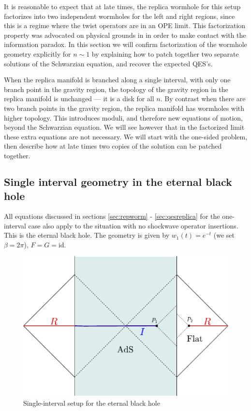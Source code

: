 \documentclass[12pt]{article}
\numberwithin{equation}{section}
\begin{document}
\begin{spacing}{1.1}
It is reasonable to expect that at late times, the replica wormhole for this setup factorizes into two independent wormholes for the left and right regions, since this is a regime where the twist operators are in an OPE limit. This factorization property was advocated on physical grounds in \cite[Section 5]{Almheiri:2019qdq} in order to make contact with the information paradox. In this section we will confirm factorization of the wormhole geometry explicitly for $n \sim 1$ by explaining how to patch together two separate solutions of the Schwarzian equation, and recover the expected QES's.
 
When the replica manifold is branched along a single interval, with only one branch point in the gravity region, the topology of the gravity region in the replica manifold is unchanged --- it is a disk for all $n$. By contrast when there are two branch points in the gravity region, the replica manifold has wormholes with higher topology. This introduces moduli, and therefore new equations of motion, beyond the Schwarzian equation. We will see however that in the factorized limit these extra equations are not necessary. We will start with the one-sided problem, then describe how at late times two copies of the solution can be patched together.
 
 \subsection{  Single interval geometry in the eternal black hole}

All equations discussed in sections \ref{sec:repworm} - \ref{sec:qesreplica} for the one-interval case also apply to the situation with no shockwave operator insertions. This is the eternal black hole. The geometry is given by $w_1(t) =e^{ -t}$ (we set $\beta= 2\pi$), $F=G= \text{id}$. 

\begin{figure}
\centering
\includegraphics[scale=0.74]{./figures/single_interval_eternal.pdf}
\caption{Single-interval setup for the eternal black hole} \label{singleintervalpenrose}
\end{figure}





\end{spacing}
\end{document}
